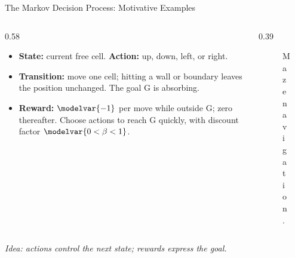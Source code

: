 \begin{frame}{The Markov Decision Process: Motivative Examples}
\small
{}
\begin{columns}[c]
\begin{column}{0.58\textwidth}
\begin{itemize}
  \item \textbf{State:} current free cell. \textbf{Action:} up, down, left, or right.
  \item \textbf{Transition:} move one cell; hitting a wall or boundary leaves the position unchanged. The goal G is absorbing.
  \item \textbf{Reward:} \(\modelvar{-1}\) per move while outside G; zero thereafter. Choose actions to reach G quickly, with discount factor \(\modelvar{0<\beta<1}\).
\end{itemize}
\end{column}
\begin{column}{0.39\textwidth}
\begin{figure}
\centering
{}
\caption{Maze navigation.}
\end{figure}
\end{column}
\end{columns}
\medskip
\textit{Idea: actions control the next state; rewards express the goal.}
\end{frame}

